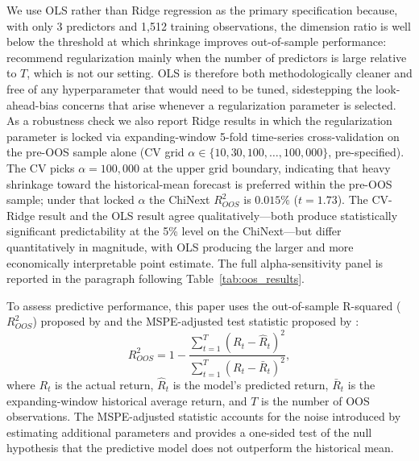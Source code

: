 \documentclass[AER]{AEA}
\begin{document}
We use OLS rather than Ridge regression as the primary specification because, with only 3 predictors and 1{,}512 training observations, the dimension ratio is well below the threshold at which shrinkage improves out-of-sample performance: \citet{campbell2008predicting} recommend regularization mainly when the number of predictors is large relative to $T$, which is not our setting. OLS is therefore both methodologically cleaner and free of any hyperparameter that would need to be tuned, sidestepping the look-ahead-bias concerns that arise whenever a regularization parameter is selected. As a robustness check we also report Ridge results in which the regularization parameter is locked via expanding-window 5-fold time-series cross-validation on the pre-OOS sample alone (CV grid $\alpha \in \{10, 30, 100, \ldots, 100{,}000\}$, pre-specified). The CV picks $\alpha=100{,}000$ at the upper grid boundary, indicating that heavy shrinkage toward the historical-mean forecast is preferred within the pre-OOS sample; under that locked $\alpha$ the ChiNext $R^2_{OOS}$ is $0.015\%$ ($t=1.73$). The CV-Ridge result and the OLS result agree qualitatively---both produce statistically significant predictability at the 5\% level on the ChiNext---but differ quantitatively in magnitude, with OLS producing the larger and more economically interpretable point estimate. The full alpha-sensitivity panel is reported in the paragraph following Table~\ref{tab:oos_results}.

To assess predictive performance, this paper uses the out-of-sample R-squared ($R^2_{OOS}$) proposed by \citet{campbell2008predicting} and the MSPE-adjusted test statistic proposed by \citet{clark2007approximately}:
\begin{equation}
R^2_{OOS} = 1 - \frac{\sum_{t=1}^{T} (R_t - \hat{R}_t)^2}{\sum_{t=1}^{T} (R_t - \bar{R}_t)^2},
\end{equation}
where $R_t$ is the actual return, $\hat{R}_t$ is the model's predicted return, $\bar{R}_t$ is the expanding-window historical average return, and $T$ is the number of OOS observations. The MSPE-adjusted statistic accounts for the noise introduced by estimating additional parameters and provides a one-sided test of the null hypothesis that the predictive model does not outperform the historical mean.
\end{document}
